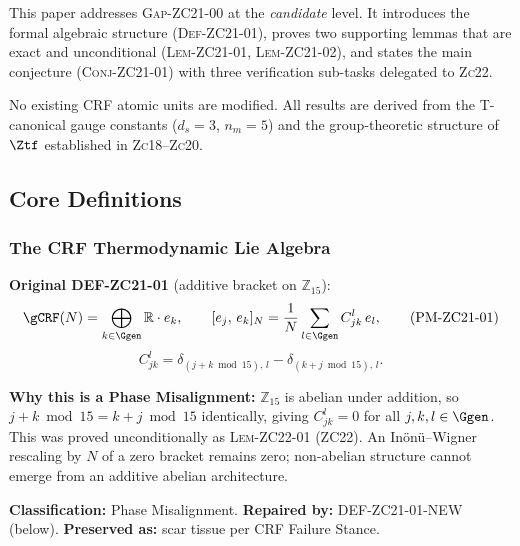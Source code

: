 \documentclass[12pt, a4paper]{article}
\begin{document}
This paper addresses \textsc{Gap-ZC21-00} at the \emph{candidate} level.
It introduces the formal algebraic structure (\textsc{Def-ZC21-01}),
proves two supporting lemmas that are exact and unconditional
(\textsc{Lem-ZC21-01}, \textsc{Lem-ZC21-02}),
and states the main conjecture (\textsc{Conj-ZC21-01})
with three verification sub-tasks delegated to \textsc{Zc22}.

No existing CRF atomic units are modified.
All results are derived from the T-canonical gauge constants
($d_s = 3$, $n_m = 5$) and the group-theoretic structure of
$\Ztf$ established in \textsc{Zc18}--\textsc{Zc20}.

\subsection{Core Definitions}
\label{zc21:sec:defs}

\subsubsection{The CRF Thermodynamic Lie Algebra}


\begin{formalbox}[title={PM-ZC21-01 (Phase Misalignment — Scar Tissue)}]
\label{zc21:pm:zc21-01}
\textbf{Original DEF-ZC21-01} (additive bracket on $\mathbb{Z}_{15}$):
\begin{equation}
  \gCRF(N) = \bigoplus_{k \in \Ggen} \mathbb{R} \cdot e_k,
  \qquad
  [e_j,\, e_k]_N = \frac{1}{N} \sum_{l \in \Ggen} C_{jk}^l \, e_l,
  \tag{PM-ZC21-01}
\end{equation}
\[
  C_{jk}^l = \delta_{(j+k \bmod 15),\, l} - \delta_{(k+j \bmod 15),\, l}.
\]

\textbf{Why this is a Phase Misalignment:}
$\mathbb{Z}_{15}$ is abelian under addition, so $j + k \bmod 15 = k + j \bmod 15$
identically, giving $C_{jk}^l = 0$ for all $j,k,l \in \Ggen$.
This was proved unconditionally as \textsc{Lem-ZC22-01} (ZC22).
An Inönü--Wigner rescaling by $N$ of a zero bracket remains zero;
non-abelian structure cannot emerge from an additive abelian architecture.

\textbf{Classification:} Phase Misalignment.
\textbf{Repaired by:} DEF-ZC21-01-NEW (below).
\textbf{Preserved as:} scar tissue per CRF Failure Stance.
\end{formalbox}
\end{document}
